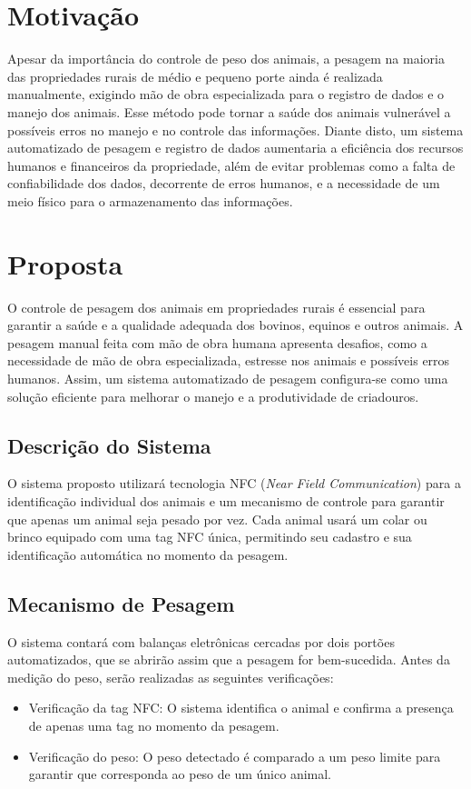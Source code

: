 \documentclass[11pt]{article}
\begin{document}
\section{Motivação}
Apesar da importância do controle de peso dos animais, a pesagem na maioria das propriedades rurais de médio e pequeno porte ainda é realizada manualmente, exigindo mão de obra especializada para o registro de dados e o manejo dos animais. Esse método pode tornar a saúde dos animais vulnerável a possíveis erros no manejo e no controle das informações. Diante disto, um sistema automatizado de pesagem e registro de dados aumentaria a eficiência dos recursos humanos e financeiros da propriedade, além de evitar problemas como a falta de confiabilidade dos dados, decorrente de erros humanos, e a necessidade de um meio físico para o armazenamento das informações.

\section{Proposta}
O controle de pesagem dos animais em propriedades rurais é essencial para garantir a saúde e a qualidade adequada dos bovinos, equinos e outros animais. A pesagem manual feita com mão de obra humana apresenta desafios, como a necessidade de mão de obra especializada, estresse nos animais e possíveis erros humanos. Assim, um sistema automatizado de pesagem configura-se como uma solução eficiente para melhorar o manejo e a produtividade de criadouros.

\subsection{Descrição do Sistema}
O sistema proposto utilizará tecnologia NFC (\textit{Near Field Communication}) para a identificação individual dos animais e um mecanismo de controle para garantir que apenas um animal seja pesado por vez. Cada animal usará um colar ou brinco equipado com uma tag NFC única, permitindo seu cadastro e sua identificação automática no momento da pesagem.

\subsection{Mecanismo de Pesagem}
O sistema contará com balanças eletrônicas cercadas por dois portões automatizados, que se abrirão assim que a pesagem for bem-sucedida. Antes da medição do peso, serão realizadas as seguintes verificações:

\begin{itemize}
    \item Verificação da tag NFC: O sistema identifica o animal e confirma a presença de apenas uma tag no momento da pesagem.
    \item Verificação do peso: O peso detectado é comparado a um peso limite para garantir que corresponda ao peso de um único animal.
\end{itemize}
\end{document}
